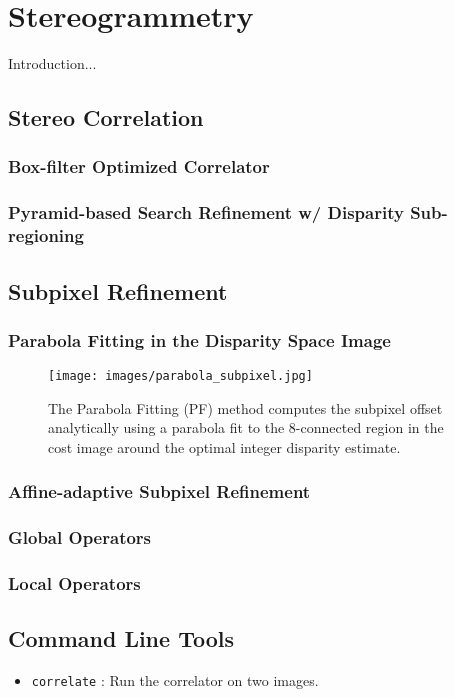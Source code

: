 \chapter{Stereogrammetry}\label{ch:stereo-module}

Introduction...

\section{Stereo Correlation}
\label{sec:stereo_correlation}

\subsection{Box-filter Optimized Correlator}

\subsection{Pyramid-based Search Refinement w/ Disparity Sub-regioning}


\section{Subpixel Refinement}
\label{sec:subpixel_refinement}

\subsection{Parabola Fitting in the Disparity Space Image}

\begin{figure}[tbp]
\begin{center}
  \texttt{[image: images/parabola\_subpixel.jpg]}
 \end{center}
 \caption{The Parabola Fitting (PF) method computes the subpixel
   offset analytically using a parabola fit to the 8-connected region
   in the cost image around the optimal integer disparity estimate.}
  \label{fig:parabola-subpixel}
\end{figure}

\subsection{Affine-adaptive Subpixel Refinement}

\subsection{Global Operators}

\subsection{Local Operators}

\section{Command Line Tools}


\begin{itemize}
\item \verb#correlate#   : Run the correlator on two images.
\end{itemize}



\begin{thebibliography}{1}

\end{thebibliography}

